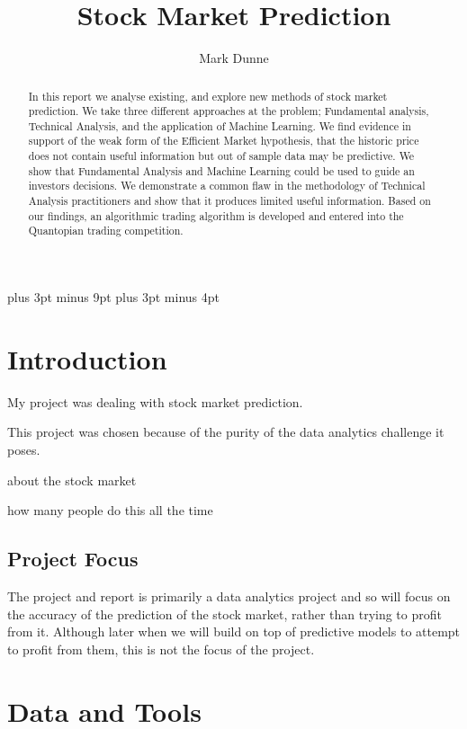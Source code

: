 \documentclass{report}
\title{Stock Market Prediction}
\author{Mark Dunne}
\begin{document}
\belowdisplayskip=12pt plus 3pt minus 9pt
\belowdisplayshortskip=7pt plus 3pt minus 4pt

\maketitle

\begin{abstract}

In this report we analyse existing, and explore new methods of stock market prediction. We take three different approaches at the problem; Fundamental analysis, Technical Analysis, and the application of Machine Learning. We find evidence in support of the weak form of the Efficient Market hypothesis, that the historic price does not contain useful information but out of sample data may be predictive. We show that Fundamental Analysis and Machine Learning could be used to guide an investors decisions. We demonstrate a common flaw in the methodology of Technical Analysis practitioners and show that it produces limited useful information. Based on our findings, an algorithmic trading algorithm is developed and entered into the Quantopian trading competition.

\end{abstract}

\tableofcontents

\chapter{Introduction}

My project was dealing with stock market prediction.

This project was chosen because of the purity of the data analytics challenge it poses.

about the stock market

how many people do this all the time

\section{Project Focus}

The project and report is primarily a data analytics project and so will focus on the accuracy of the prediction of the stock market, rather than trying to profit from it. Although later when we will build on top of predictive models to attempt to profit from them, this is not the focus of the project.

\chapter{Data and Tools}
\end{document}
